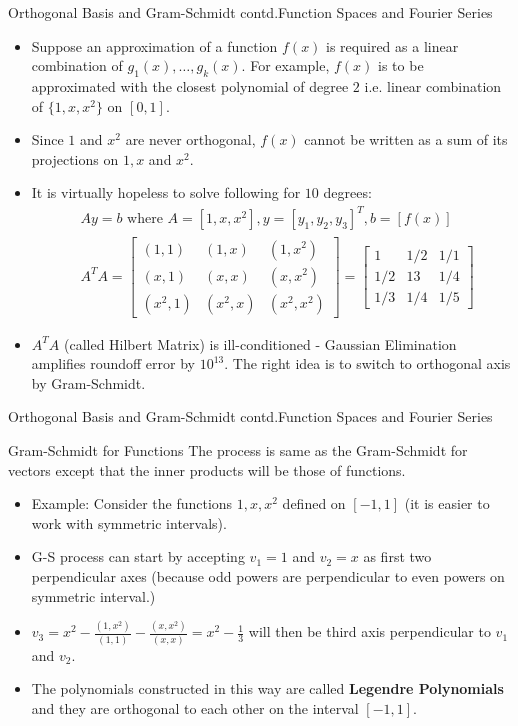 \documentclass{beamer}
\begin{document}
\begin{frame}{Orthogonal Basis and Gram-Schmidt contd.}{Function Spaces and Fourier Series}
\begin{itemize}
    \item Suppose an approximation of a function $f(x)$ is required as a linear combination of $g_1(x),\ldots,g_{k}(x)$. For example, $f(x)$ is to be approximated with the closest polynomial of degree $2$ i.e. linear combination of $\{1,x,x^2\}$ on $[0,1]$.
    \item Since $1$ and $x^2$ are never orthogonal, $f(x)$ cannot be written as a sum of its projections on $1,x$ and $x^2$.
    \item It is virtually hopeless to solve following for $10$ degrees:
    \begin{align*}
        &Ay = b \text{ where } A= [1,x,x^2], y = [y_1,y_2,y_3]^T, b = [f(x)]\\
        &A^TA = \begin{bmatrix}(1,1)&(1,x)&(1,x^2)\\(x,1)&(x,x)&(x,x^2)\\(x^2,1)&(x^2,x)&(x^2,x^2)\end{bmatrix} = \begin{bmatrix}1&1/2&1/1\\1/2&13&1/4\\1/3&1/4&1/5\end{bmatrix}
    \end{align*}
    \item $A^TA$ (called Hilbert Matrix) is ill-conditioned - Gaussian Elimination amplifies roundoff error by $10^{13}$. The right idea is to switch to orthogonal axis by Gram-Schmidt.
\end{itemize}
\end{frame}

\begin{frame}{Orthogonal Basis and Gram-Schmidt contd.}{Function Spaces and Fourier Series}
\begin{exampleblock}{Gram-Schmidt for Functions}
The process is same as the Gram-Schmidt for vectors except that the inner products will be those of functions.
\begin{itemize}
    \item Example: Consider the functions $1, x, x^2$ defined on $[-1,1]$ (it is easier to work with symmetric intervals).
    \item G-S process can start by accepting $v_1=1$ and $v_2=x$ as first two perpendicular axes (because odd powers are perpendicular to even powers on symmetric interval.)
    \item $v_3 = x^2 - \frac{(1,x^2)}{(1,1)} - \frac{(x,x^2)}{(x,x)} = x^2 - \frac{1}{3}$ will then be third axis perpendicular to $v_1$ and $v_2$.
    \item The polynomials constructed in this way are called \textbf{Legendre Polynomials} and they are orthogonal to each other on the interval $[-1,1]$.
\end{itemize}
\end{exampleblock}
\end{frame}
\end{document}
